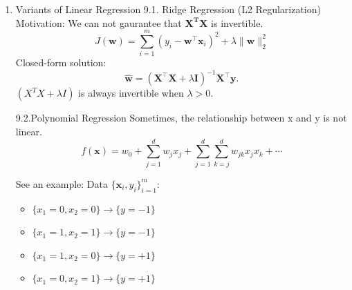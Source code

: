 \documentclass[
]{ctexart}
\providecommand{\tightlist}{%
  \setlength{\itemsep}{0pt}\setlength{\parskip}{0pt}}
\begin{document}
\begin{enumerate}
  \begin{itemize}
  \item
    \textbf{Binary Classification} If \(\mathbf{X^TX}\) is invertible,
    the closed-form solution is
    \[\text{Learning:} \quad \hat{\mathbf{w}} = (\mathbf{X}^\top \mathbf{X})^{-1} \mathbf{X}^\top \mathbf{y}. \\
     \text{Prediction:} \quad \hat{y}(X_\text{new}) = \operatorname{sgn}(\mathbf{X}_{\text{new}}\hat{\mathbf{w}}).\]
  \item
    \textbf{Multi-class Classification}
    \[\text{Learning:} \quad \hat{\mathbf{W}} = (\mathbf{X}^\top \mathbf{X})^{-1} \mathbf{X}^\top \mathbf{Y}. \\
     \text{Prediction:} \quad \hat{\mathbf{Y}}(\mathbf{X}_{\text{new}}) = \arg\max_{i=1,...,c} \mathbf{X}_{\text{new}}\hat{\mathbf{W}}.\]
    Each row in Y is a one-hot vector. For example, if there are 3
    classes and the label is class 2, then the one-hot vector is
    {[}0,1,0{]}.
  \end{itemize}
\item
  Variants of Linear Regression 9.1. Ridge Regression (L2
  Regularization) Motivation: We can not gaurantee that
  \(\mathbf{X^TX}\) is invertible.
  \[J(\mathbf{w}) = \sum_{i=1}^{m} (y_i - \mathbf{w}^\top \mathbf{x}_i)^2 + \lambda \|\mathbf{w}\|_2^2\]
  Closed-form solution:
  \[\hat{\mathbf{w}} = (\mathbf{X}^\top \mathbf{X} + \lambda \mathbf{I})^{-1} \mathbf{X}^\top \mathbf{y}.\]
  \((X^TX + \lambda I)\) is always invertible when \(\lambda > 0\).

  9.2.Polynomial Regression Sometimes, the relationship between x and y
  is not linear. \[
   f(\mathbf{x}) = w_0 + \sum_{j=1}^{d} w_j x_j + \sum_{j=1}^{d} \sum_{k=j}^{d} w_{jk} x_j x_k + \cdots
   \]

  See an example: Data \(\{ \mathbf{x}_i, y_i \}_{i=1}^m\):

  \begin{itemize}
  \tightlist
  \item
    \(\{x_1 = 0, x_2 = 0\} \rightarrow \{y = -1\}\)
  \item
    \(\{x_1 = 1, x_2 = 1\} \rightarrow \{y = -1\}\)
  \item
    \(\{x_1 = 1, x_2 = 0\} \rightarrow \{y = +1\}\)
  \item
    \(\{x_1 = 0, x_2 = 1\} \rightarrow \{y = +1\}\)
  \end{itemize}


\end{enumerate}
\end{document}
